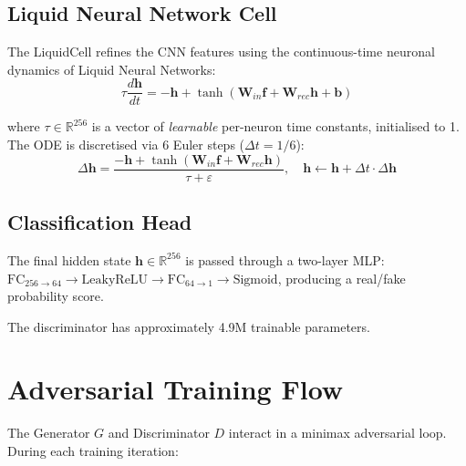 \subsection{Liquid Neural Network Cell}

The LiquidCell refines the CNN features using the continuous-time neuronal dynamics of Liquid Neural Networks:
\begin{equation}
    \tau \frac{d\mathbf{h}}{dt} = -\mathbf{h} + \tanh(\mathbf{W}_{in}\mathbf{f} + \mathbf{W}_{rec}\mathbf{h} + \mathbf{b})
\end{equation}

where $\tau \in \mathbb{R}^{256}$ is a vector of \emph{learnable} per-neuron time constants, initialised to 1. The ODE is discretised via 6 Euler steps ($\Delta t = 1/6$):
\begin{equation}
    \Delta\mathbf{h} = \frac{-\mathbf{h} + \tanh(\mathbf{W}_{in}\mathbf{f} + \mathbf{W}_{rec}\mathbf{h})}{\tau + \varepsilon}, \quad \mathbf{h} \leftarrow \mathbf{h} + \Delta t \cdot \Delta\mathbf{h}
\end{equation}

\subsection{Classification Head}

The final hidden state $\mathbf{h} \in \mathbb{R}^{256}$ is passed through a two-layer MLP: $\text{FC}_{256 \to 64} \to \text{LeakyReLU} \to \text{FC}_{64 \to 1} \to \text{Sigmoid}$, producing a real/fake probability score.

The discriminator has approximately 4.9M trainable parameters.

\section{Adversarial Training Flow}

The Generator $G$ and Discriminator $D$ interact in a minimax adversarial loop. During each training iteration:

